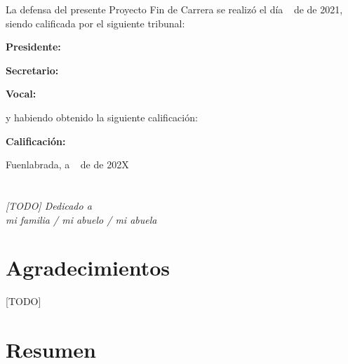 \documentclass[a4paper, 12pt]{book}
\begin{document}
\vspace{1cm}
La defensa del presente Proyecto Fin de Carrera se realizó el día \qquad$\;\,$ de \qquad\qquad\qquad\qquad \newline de 2021, siendo calificada por el siguiente tribunal:


\vspace{0.5cm}
\textbf{Presidente:}

\vspace{1.2cm}
\textbf{Secretario:}

\vspace{1.2cm}
\textbf{Vocal:}


\vspace{1.2cm}
y habiendo obtenido la siguiente calificación:

\vspace{1cm}
\textbf{Calificación:}


\vspace{1cm}
\begin{flushright}
Fuenlabrada, a \qquad$\;\,$ de \qquad\qquad\qquad\qquad de 202X
\end{flushright}


\chapter*{}
\begin{flushright}
\textit{[TODO] Dedicado a \\
mi familia / mi abuelo / mi abuela}
\end{flushright}


\chapter*{Agradecimientos}

[TODO]


\chapter*{Resumen}
\end{document}
